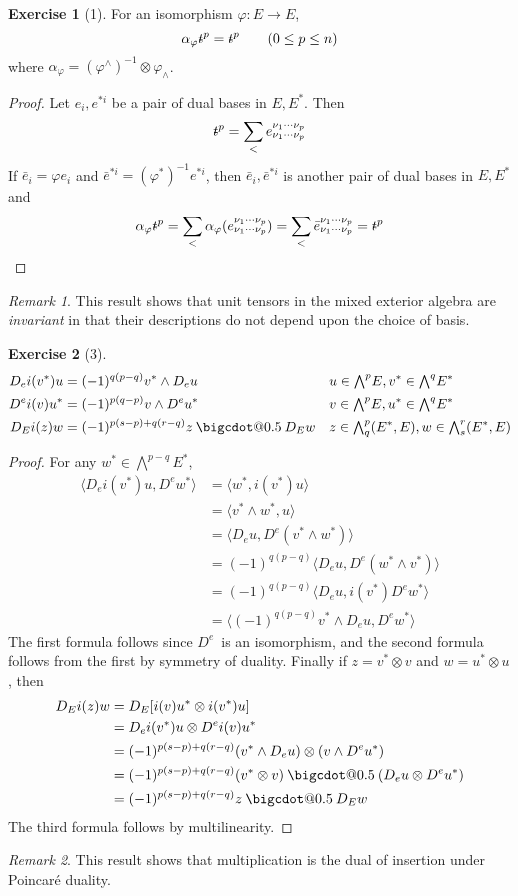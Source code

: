 \documentclass[letterpaper,12pt]{article}
\makeatletter
\newcommand{\bigcdot}[1]{\mathbin{\mathpalette\bigcdot@{#1}}}
\newcommand{\bigcdot@}[2]{%
  \sbox0{$#1\vcenter{}$}%
  \sbox2{$#1\cdot\m@th$}%
  \hbox{%
    \hfil
    \raise\ht0\hbox{%
      \scalebox{#2}{%
        \lower\ht0\hbox{$#1\bullet\m@th$}%
      }%
    }%
    \hfil
  }%
}
\newcommand{\tprod}{\otimes}
\newcommand{\eprod}{\wedge}
\newcommand{\bigeprod}{\bigwedge}
\newcommand{\medeprod}{{\textstyle\bigeprod}}
\newcommand{\mprod}{\bigcdot{0.5}}
\newcommand{\sprod}[2]{\langle#1,#2\rangle}
\newcommand{\stroked}[1]{\mathrlap{\text{\kern0.05em-}}#1}
\newcommand{\unit}{\stroked{t}}
\theoremstyle{definition}
\newtheorem*{exer}{Exercise}
\theoremstyle{remark}
\newtheorem*{rmk}{Remark}
\makeatother
\begin{document}
\begin{exer}[1]
For an isomorphism \(\varphi:E\to E\),
\[\alpha_{\varphi}\unit^p=\unit^p\qquad(0\le p\le n)\]
where \(\alpha_{\varphi}=(\varphi^{\eprod})^{-1}\tprod\varphi_{\eprod}\).
\end{exer}
\begin{proof}
Let \(e_i,e^{*i}\) be a pair of dual bases in \(E,E^*\). Then
\[\unit^p=\sum_{<}e^{\nu_1\cdots\nu_p}_{\nu_1\cdots\nu_p}\]
If \(\bar{e}_i=\varphi e_i\) and \(\bar{e}^{*i}=(\varphi^*)^{-1}e^{*i}\), then \(\bar{e}_i,\bar{e}^{*i}\) is another pair of dual bases in \(E,E^*\) and
\[\alpha_{\varphi}\unit^p=\sum_{<}\alpha_{\varphi}(e^{\nu_1\cdots\nu_p}_{\nu_1\cdots\nu_p})=\sum_{<}\bar{e}^{\nu_1\cdots\nu_p}_{\nu_1\cdots\nu_p}=\unit^p\qedhere\]
\end{proof}
\begin{rmk}
This result shows that unit tensors in the mixed exterior algebra are \emph{invariant} in that their descriptions do not depend upon the choice of basis.
\end{rmk}

\begin{exer}[3]
\begin{align*}
D_e i(v^*)u&=(-1)^{q(p-q)}v^*\eprod D_eu&&u\in\medeprod^p E,v^*\in\medeprod^q E^*\\
D^e i(v)u^*&=(-1)^{p(q-p)}v\eprod D^e u^*&&v\in\medeprod^p E,u^*\in\medeprod^q E^*\\
D_E i(z)w&=(-1)^{p(s-p)+q(r-q)}z\mprod D_Ew&&z\in\medeprod^p_q(E^*,E),w\in\medeprod^r_s(E^*,E)
\end{align*}
\end{exer}
\begin{proof}
For any \(w^*\in\medeprod^{p-q}E^*\),
\begin{align*}
\sprod{D_e i(v^*)u}{D^e w^*}&=\sprod{w^*}{i(v^*)u}\\
	&=\sprod{v^*\eprod w^*}{u}\\
	&=\sprod{D_e u}{D^e(v^*\eprod w^*)}\\
	&=(-1)^{q(p-q)}\sprod{D_e u}{D^e(w^*\eprod v^*)}\\
	&=(-1)^{q(p-q)}\sprod{D_e u}{i(v^*)D^e w^*}\\
	&=\sprod{(-1)^{q(p-q)}v^*\eprod D_e u}{D^e w^*}
\end{align*}
The first formula follows since \(D^e\)~is an isomorphism, and the second formula follows from the first by symmetry of duality. Finally if \(z=v^*\tprod v\) and \(w=u^*\tprod u\), then
\begin{align*}
D_E i(z)w&=D_E[i(v)u^*\tprod i(v^*)u]\\
	&=D_e i(v^*)u\tprod D^e i(v)u^*\\
	&=(-1)^{p(s-p)+q(r-q)}(v^*\eprod D_e u)\tprod(v\eprod D^e u^*)\\
	&=(-1)^{p(s-p)+q(r-q)}(v^*\tprod v)\mprod(D_e u\tprod D^e u^*)\\
	&=(-1)^{p(s-p)+q(r-q)}z\mprod D_E w
\end{align*}
The third formula follows by multilinearity.
\end{proof}
\begin{rmk}
This result shows that multiplication is the dual of insertion under Poincar\'e duality.
\end{rmk}
\end{document}
